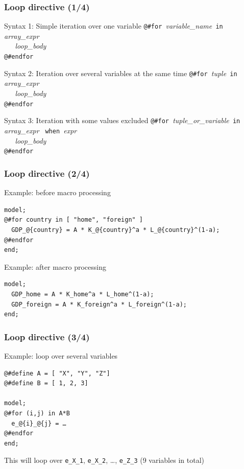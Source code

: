 \documentclass[aspectratio=169]{beamer}
\begin{document}
\begin{frame}[fragile=singleslide]
  \frametitle{Loop directive (1/4)}
  \begin{block}{Syntax 1: Simple iteration over one variable}
\verb+@#for +\textit{variable\_name}\verb+ in +\textit{array\_expr} \\
\verb+   +\textit{loop\_body} \\
\verb+@#endfor+
  \end{block}
  \begin{block}{Syntax 2: Iteration over several variables at the same time}
\verb+@#for +\textit{tuple}\verb+ in +\textit{array\_expr} \\
\verb+   +\textit{loop\_body} \\
\verb+@#endfor+
  \end{block}
  \begin{block}{Syntax 3: Iteration with some values excluded}
\verb+@#for +\textit{tuple\_or\_variable}\verb+ in +\textit{array\_expr} \verb+ when +\textit{expr}\\
\verb+   +\textit{loop\_body} \\
\verb+@#endfor+
  \end{block}
\end{frame}

\begin{frame}[fragile=singleslide]
  \frametitle{Loop directive (2/4)}
  \begin{block}{Example: before macro processing}
    \small
\begin{verbatim}
model;
@#for country in [ "home", "foreign" ]
  GDP_@{country} = A * K_@{country}^a * L_@{country}^(1-a);
@#endfor
end;
\end{verbatim}
    \normalsize
  \end{block}

  \begin{block}{Example: after macro processing}
    \small
\begin{verbatim}
model;
  GDP_home = A * K_home^a * L_home^(1-a);
  GDP_foreign = A * K_foreign^a * L_foreign^(1-a);
end;
\end{verbatim}
    \normalsize
  \end{block}
\end{frame}

\begin{frame}[fragile=singleslide]
  \frametitle{Loop directive (3/4)}
  \begin{block}{Example: loop over several variables}
    \small
\begin{verbatim}
@#define A = [ "X", "Y", "Z"]
@#define B = [ 1, 2, 3]

model;
@#for (i,j) in A*B
  e_@{i}_@{j} = …
@#endfor
end;
\end{verbatim}
    \normalsize
    This will loop over \texttt{e\_X\_1}, \texttt{e\_X\_2}, …, \texttt{e\_Z\_3} (9
    variables in total)
  \end{block}
\end{frame}
\end{document}
